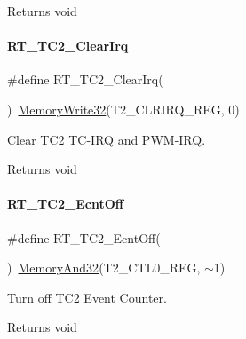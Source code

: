 \begin{DoxyReturn}{Returns}
void 
\end{DoxyReturn}
\mbox{\label{a00047_a92052b959fbb893385c5adc2c4b00bad}} 
\paragraph{\texorpdfstring{R\+T\+\_\+\+T\+C2\+\_\+\+Clear\+Irq}{RT\_TC2\_ClearIrq}}
{\footnotesize\ttfamily \#define R\+T\+\_\+\+T\+C2\+\_\+\+Clear\+Irq(\begin{DoxyParamCaption}{ }\end{DoxyParamCaption})~\mbox{\hyperlink{a00020_ad9953f631a539cfaa35baf94f878b3ec}{Memory\+Write32}}(T2\+\_\+\+C\+L\+R\+I\+R\+Q\+\_\+\+R\+EG, 0)}



Clear T\+C2 T\+C-\/\+I\+RQ and P\+W\+M-\/\+I\+RQ. 

\begin{DoxyReturn}{Returns}
void 
\end{DoxyReturn}
\mbox{\label{a00047_af77e205baae8e267fda5374c167ab76c}} 
\paragraph{\texorpdfstring{R\+T\+\_\+\+T\+C2\+\_\+\+Ecnt\+Off}{RT\_TC2\_EcntOff}}
{\footnotesize\ttfamily \#define R\+T\+\_\+\+T\+C2\+\_\+\+Ecnt\+Off(\begin{DoxyParamCaption}{ }\end{DoxyParamCaption})~\mbox{\hyperlink{a00020_a5c1a2bd4c1bd4c2f429d8042a45327ff}{Memory\+And32}}(T2\+\_\+\+C\+T\+L0\+\_\+\+R\+EG, $\sim$1)}



Turn off T\+C2 Event Counter. 

\begin{DoxyReturn}{Returns}
void 
\end{DoxyReturn}
\mbox{\label{a00047_a261544e2cbdbdeee0d22734b29827cd2}} 
